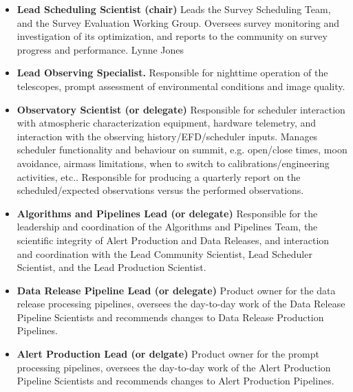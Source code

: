 \documentclass[OPS,authoryear,toc]{lsstdoc}
\begin{document}
\begin{itemize}
\item {
{\bf Lead Scheduling Scientist (chair)}
Leads the Survey Scheduling Team, and the Survey Evaluation Working Group. Oversees survey monitoring and investigation of its optimization, and reports to the community on survey progress and performance. 
 Lynne Jones
}
\item{
{\bf Lead Observing Specialist.}
 Responsible for nighttime operation of the telescopes,   prompt assessment of environmental conditions and image quality.  
}
\item{
{\bf Observatory Scientist (or delegate)}
 Responsible for scheduler interaction with atmospheric characterization equipment, hardware telemetry, and interaction with the observing history/EFD/scheduler inputs. Manages scheduler functionality and behaviour on summit, e.g. open/close times, moon avoidance, airmass limitations, when to switch to calibrations/engineering activities, etc.. Responsible for producing a quarterly report on the scheduled/expected observations versus the performed observations.  
}
\item{
{\bf Algorithms and Pipelines Lead (or delegate)}
 Responsible for the leadership and coordination of the Algorithms and Pipelines Team, the scientific integrity of Alert Production and Data Releases, and interaction and coordination with the Lead Community Scientist, Lead Scheduler Scientist, and the Lead Production Scientist. 
}
\item{
{\bf Data Release Pipeline Lead (or delegate)}
 Product owner for the data release processing pipelines,  oversees the day-to-day work of the Data Release Pipeline Scientists and recommends changes to Data Release Production Pipelines.
}
\item{
{\bf Alert Production Lead (or delgate)}
 Product owner for the  prompt processing pipelines, oversees the day-to-day work of the Alert Production Pipeline Scientists and recommends changes to Alert Production Pipelines.
}
\end{itemize}
\end{document}
